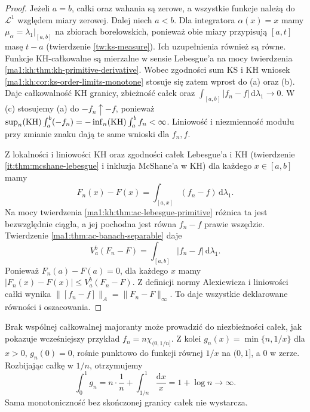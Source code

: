 \begin{proof}
Jeżeli $a=b$, całki oraz wahania są zerowe, a wszystkie
funkcje należą do $\mathcal L^1$ względem miary zerowej.
Dalej niech $a<b$. Dla integratora $\alpha(x)=x$ mamy
$\mu_\alpha=\lambda_1|_{[a,b]}$ na zbiorach borelowskich,
ponieważ obie miary przypisują $[a,t]$ masę $t-a$
(twierdzenie \ref{tw:ks-measure}). Ich uzupełnienia
również są równe. Funkcje KH-całkowalne są mierzalne
w sensie Lebesgue'a na mocy twierdzenia
\ref{ma1:kh:thm:kh-primitive-derivative}.
Wobec zgodności sum KS i KH wniosek
\ref{ma1:kh:cor:ks-order-limits-monotone}
stosuje się zatem wprost do (a) oraz (b).
Daje całkowalność KH granicy, zbieżność całek
oraz $\int_{[a,b]}|f_n-f|\,\mathrm d\lambda_1\to0$.
W (c) stosujemy (a) do $-f_n\uparrow-f$, ponieważ
$\sup_n(\mathrm{KH})\int_a^b(-f_n)=-\inf_n(\mathrm{KH})\int_a^bf_n<\infty$.
Liniowość i niezmienność modułu przy zmianie znaku
dają te same wnioski dla $f_n,f$.

Z lokalności i liniowości KH oraz zgodności całek
Lebesgue'a i KH (twierdzenie \ref{it:thm:mcshane-lebesgue}
i inkluzja McShane'a w KH) dla każdego $x\in[a,b]$ mamy
\[
 F_n(x)-F(x)=\int_{[a,x]}(f_n-f)\,\mathrm d\lambda_1.
\]
Na mocy twierdzenia \ref{ma1:kh:thm:ac-lebesgue-primitive}
różnica ta jest bezwzględnie ciągła, a jej pochodna
jest równa $f_n-f$ prawie wszędzie.
Twierdzenie \ref{ma1:thm:ac-banach-separable} daje
\[
 V_a^b(F_n-F)=\int_{[a,b]}|f_n-f|\,\mathrm d\lambda_1.
\]
Ponieważ $F_n(a)-F(a)=0$, dla każdego $x$ mamy
$|F_n(x)-F(x)|\le V_a^b(F_n-F)$.
Z definicji normy Alexiewicza i liniowości całki
wynika $\|[f_n-f]\|_A=\|F_n-F\|_\infty$.
To daje wszystkie deklarowane równości i oszacowania.
\end{proof}
\begin{przyklad}
Brak wspólnej całkowalnej majoranty może prowadzić
do niezbieżności całek, jak pokazuje wcześniejszy
przykład $f_n=n\chi_{(0,1/n]}$.
Z kolei $g_n(x)=\min\{n,1/x\}$ dla $x>0$, $g_n(0)=0$, rośnie punktowo do funkcji równej $1/x$ na $(0,1]$, a $0$ w zerze. Rozbijając całkę w $1/n$, otrzymujemy
\[
 \int_0^1 g_n=n\cdot\frac1n+
                 \int_{1/n}^1\frac{\mathrm dx}{x}
 =1+\log n\longrightarrow\infty.
\] Sama monotoniczność bez skończonej granicy całek nie wystarcza.
\end{przyklad}

